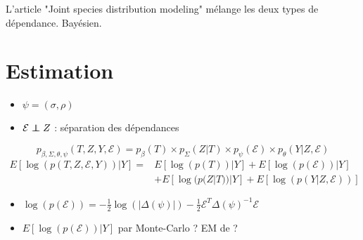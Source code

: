 \documentclass[10pt,a4paper]{article}
\newcommand{\e}{\mathcal{E}}
\newcommand\independent{\protect\mathpalette{\protect\independenT}{\perp}}
\def\independenT#1#2{\mathrel{\rlap{$#1#2$}\mkern2mu{#1#2}}}
\begin{document}
L'article "Joint species distribution modeling" \cite{vanhatalo}  mélange les deux types de dépendance. Bayésien.


\section{Estimation}
\begin{itemize}
\item$\psi = (\sigma, \rho)$
\item$\e \independent Z $  : séparation des dépendances
\end{itemize}

$$p_{\beta, \Sigma,\theta,\psi}(T,Z,Y,\e) = p_\beta(T) \times p_\Sigma(Z|T) \times p_\psi(\e) \times p_\theta(Y|Z,\e)$$
\begin{align*}
E\left [\log(p(T,Z,\e,Y))|Y\right ] = &E\left [\log(p(T))|Y\right ] +E\left [\log(p(\e))|Y\right ] \\
&+E\left [\log(p(Z|T))|Y\right ] +E\left [\log(p(Y|Z,\e))\right ] 
\end{align*}

\begin{itemize}
\item $\log(p(\e))= -\frac{1}{2} \log(|\Delta(\psi)|) -\frac{1}{2}\e^T\Delta(\psi)^{-1}\e $  
\item  $E\left [\log(p(\e))|Y\right ] $ par Monte-Carlo ? EM de \cite{Zhang} ?
\end{itemize}


\end{document}
